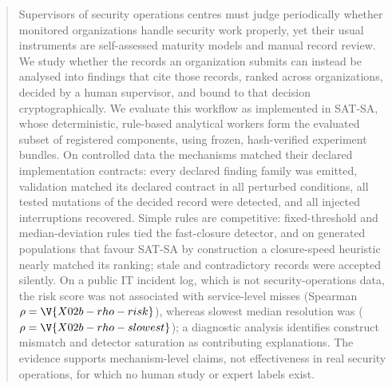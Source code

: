 \begin{abstract}
Supervisors of security operations centres must judge periodically whether monitored
organizations handle security work properly, yet their usual instruments are
self-assessed maturity models and manual record review. We study whether the records
an organization submits can instead be analysed into findings that cite those
records, ranked across organizations, decided by a human supervisor, and bound to that
decision cryptographically. We evaluate this workflow as implemented in SAT-SA, whose
 deterministic, rule-based analytical workers form the evaluated subset
of  registered components, using frozen, hash-verified experiment
bundles. On controlled data the mechanisms matched their declared implementation contracts: every declared finding
family was emitted, validation matched its declared contract in all 
perturbed conditions, all  tested mutations of the decided record were
detected, and all  injected interruptions recovered. Simple rules are
competitive: fixed-threshold and median-deviation rules tied the fast-closure
detector, and on generated populations that favour SAT-SA by construction a
closure-speed heuristic nearly matched its ranking; stale and contradictory records
were accepted silently. On a public IT incident log, which is not security-operations
data, the risk score was not associated with service-level misses (Spearman
$\rho=\V{X02b-rho-risk}$), whereas slowest median resolution was
($\rho=\V{X02b-rho-slowest}$); a diagnostic analysis identifies construct mismatch
and detector saturation as contributing explanations. The evidence supports mechanism-level claims, not
effectiveness in real security operations, for which no human study or expert labels
exist.

\end{abstract}
